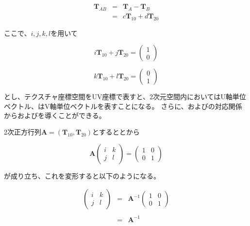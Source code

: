 \begin{eqnarray}
\bm{T}_{AB} &=& \bm{T}_A - \bm{T}_B\nonumber\\
           &=& c\bm{T}_{10} +  d\bm{T}_{20}  
\label{ETab}
\end{eqnarray}

\noindent
ここで、$i,j,k,l$を用いて

\begin{equation}
i\bm{T}_{10} + j\bm{T}_{20} = 
\begin{pmatrix}
1\\
0
\end{pmatrix}
\label{EUnit2u}
\end{equation}

\begin{equation}
k\bm{T}_{10} + l\bm{T}_{20} = 
\begin{pmatrix}
0\\
1
\end{pmatrix}
\label{EUnit2v}
\end{equation}

\noindent
とし、テクスチャ座標空間をUV座標で表すと、2次元空間内においてはU軸単位ベクトル、はV軸単位ベクトルを表すことになる。
さらに、およびの対応関係からおよびを導くことができる。

2次正方行列$\bm{A} = (\bm{T}_{10}, \bm{T}_{20})$とするととから

\begin{equation}
\bm{A} 
\begin{pmatrix}
i &k\\
j &l
\end{pmatrix}
=
\begin{pmatrix}
1 &0\\
0 &1
\end{pmatrix}
\label{EAx=I}
\end{equation}

\noindent
{}が成り立ち、これを変形すると以下のようになる。

\begin{eqnarray}
\label{EIjkl}
\begin{pmatrix}
i &k\\
j &l
\end{pmatrix}
&=& \bm{A}^{-1}
\begin{pmatrix}
1 &0\\
0 &1
\end{pmatrix}\nonumber\\
\nonumber\\
&=& \bm{A}^{-1}
\end{eqnarray}

